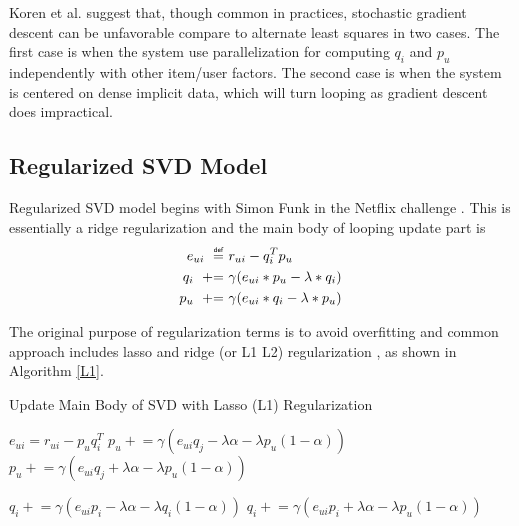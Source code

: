 \documentclass[letter paper, 11pt]{article}
\begin{document}
	Koren et al. \cite{MFinRS} suggest that, though common in practices, stochastic gradient descent can be unfavorable compare to alternate least squares in two cases. The first case is when the system use parallelization for computing $q_i$ and $p_u$ independently with other item/user factors. The second case is when the system is centered on dense implicit data, which will turn looping as gradient descent does impractical.

	

	\subsection{Regularized SVD Model}

	\newcommand\myeq{\mathrel{\overset{\makebox[0pt]{\mbox{\normalfont\tiny\sffamily def}}}{=}}}
	\newcommand{\pluseq}{\mathrel{+}=}

	Regularized SVD model begins with Simon Funk in the Netflix challenge \cite{MFinRS}. This is essentially a ridge regularization and the main body of looping update part is
	\begin{equation}
		\begin{split}
			e_{ui}\ \myeq&\ r_{ui} - q_i^T p_u \\
			q_i\ \pluseq&\ \gamma (e_{ui} * p_u - \lambda * q_i) \\
			p_u\ \pluseq&\ \gamma (e_{ui} * q_i - \lambda * p_u)
		\end{split}
	\end{equation}

	The original purpose of regularization terms is to avoid overfitting and common approach includes lasso and ridge (or L1 L2) regularization \cite{RSVD-News}, as shown in Algorithm \ref{L1}.
	
	\begin{algorithm}
		\caption{Update Main Body of SVD with Lasso (L1) Regularization\cite{RSVD-News}}
		\label{L1}
		\begin{algorithmic}
			\STATE $e_{ui} = r_{ui} - p_u q_i^T$
				\STATE $p_u \pluseq \gamma (e_{ui} q_j - \lambda \alpha - \lambda p_u ( 1 - \alpha))$
			\ELSE
				\STATE $p_u \pluseq \gamma (e_{ui} q_j + \lambda \alpha - \lambda p_u ( 1 - \alpha))$			
			\ENDIF
			
				\STATE $q_i \pluseq \gamma (e_{ui} p_i - \lambda \alpha - \lambda q_i ( 1 - \alpha))$
			\ELSE
				\STATE $q_i \pluseq \gamma (e_{ui} p_i + \lambda \alpha - \lambda p_u ( 1 - \alpha))$			
			\ENDIF
		\end{algorithmic}
	\end{algorithm}
\end{document}
